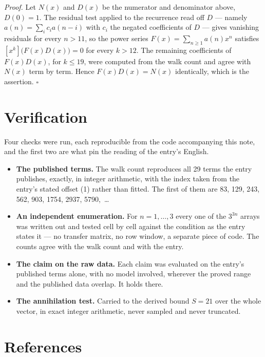 \documentclass[11pt]{article}
\theoremstyle{definition}
\begin{document}
{\itshape Proof.} Let $N(x)$ and $D(x)$ be the numerator and denominator above, $D(0)=1$. The residual test applied to the recurrence read off $D$ --- namely $a(n) = \sum_i c_i a(n-i)$ with $c_i$ the negated coefficients of $D$ --- gives vanishing residuals for every $n > 11$, so the power series $F(x)=\sum_{n\ge 1}a(n)x^n$ satisfies $[x^k]\bigl(F(x)D(x)\bigr) = 0$ for every $k > 12$. The remaining coefficients of $F(x)D(x)$, for $k \le 19$, were computed from the walk count and agree with $N(x)$ term by term. Hence $F(x)D(x) = N(x)$ identically, which is the assertion. $\square$

\section{Verification}

Four checks were run, each reproducible from the code accompanying this note, and the first two are what pin the reading of the entry's English.

\begin{itemize}

\item {\bfseries The published terms.} The walk count reproduces all 29 terms the entry publishes, exactly, in integer arithmetic, with the index taken from the entry's stated offset (1) rather than fitted. The first of them are 83, 129, 243, 562, 903, 1754, 2937, 5790,~\dots

\item {\bfseries An independent enumeration.} For $n = 1,\dots,3$ every one of the $3^{3n}$ arrays was written out and tested cell by cell against the condition as the entry states it --- no transfer matrix, no row window, a separate piece of code. The counts agree with the walk count and with the entry.

\item {\bfseries The claim on the raw data.} Each claim was evaluated on the entry's published terms alone, with no model involved, wherever the proved range and the published data overlap. It holds there.

\item {\bfseries The annihilation test.} Carried to the derived bound $S = 21$ over the whole vector, in exact integer arithmetic, never sampled and never truncated.

\end{itemize}

\section{References}
\end{document}
